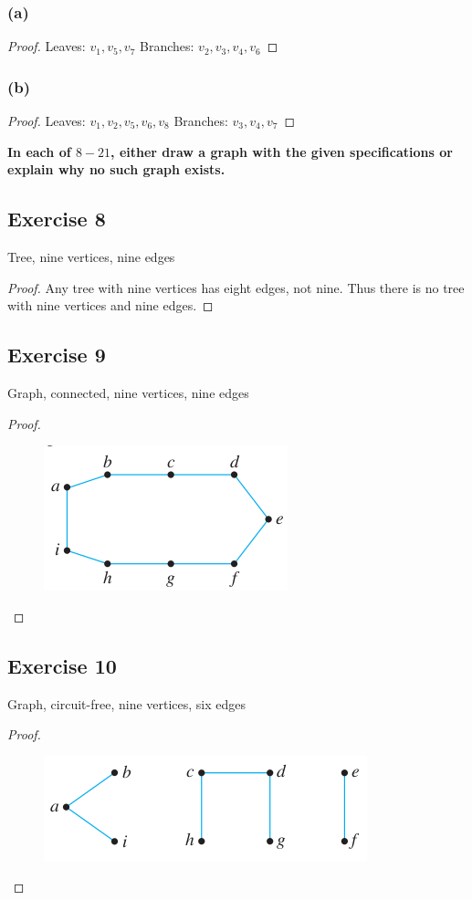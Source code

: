 \documentclass[14pt]{extarticle}
\newcommand{\cy}{\color{cyan}}
\begin{document}
\subsubsection{(a)}
\begin{proof}
    Leaves: \(v_1, v_5, v_7\) Branches: \(v_2, v_3, v_4, v_6\)
\end{proof}

\subsubsection{(b)}

\begin{proof}
    Leaves: \(v_1, v_2, v_5, v_6, v_8\) Branches: \(v_3, v_4, v_7\)
\end{proof}

{\bf \cy In each of \(8-21\), either draw a graph with the given specifications or explain why no such graph exists.}

\subsection{Exercise 8}
Tree, nine vertices, nine edges
\begin{proof}
    Any tree with nine vertices has eight edges, not nine. Thus there is no tree with nine vertices and nine edges.
\end{proof}

\subsection{Exercise 9}
Graph, connected, nine vertices, nine edges
\begin{proof}
    \begin{figure}[ht!]
        \centering
        \includegraphics[scale=0.5]{../images/10.4.9.png}
    \end{figure}
\end{proof}

\subsection{Exercise 10}
Graph, circuit-free, nine vertices, six edges
\begin{proof}
    \begin{figure}[ht!]
        \centering
        \includegraphics[scale=0.5]{../images/10.4.10.png}
    \end{figure}
\end{proof}
\end{document}
